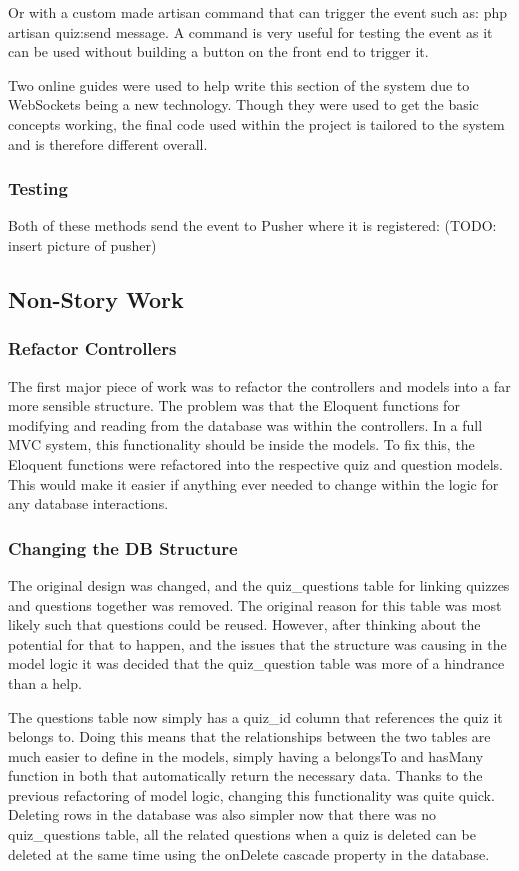 Or with a custom made artisan command that can trigger the event such as: php artisan quiz:send {message}. A command is very useful for testing the event as it can be used without building a button on the front end to trigger it.

Two online guides were used to help write this section of the system due to WebSockets being a new technology\cite{pusher-guide}\cite{echo-guide}. Though they were used to get the basic concepts working, the final code used within the project is tailored to the system and is therefore different overall.
 
\subsubsection{Testing}
Both of these methods send the event to Pusher where it is registered: (TODO: insert picture of pusher)
\newpage

\subsection{Non-Story Work}
\subsubsection{Refactor Controllers}
The first major piece of work was to refactor the controllers and models into a far more sensible structure. The problem was that the Eloquent functions for modifying and reading from the database was within the controllers. In a full MVC system, this functionality should be inside the models. To fix this, the Eloquent functions were refactored into the respective quiz and question models. This would make it easier if anything ever needed to change within the logic for any database interactions.
\subsubsection{Changing the DB Structure}
The original design was changed, and the quiz\_questions table for linking quizzes and questions together was removed. The original reason for this table was most likely such that questions could be reused. However, after thinking about the potential for that to happen, and the issues that the structure was causing in the model logic it was decided that the quiz\_question table was more of a hindrance than a help.

The questions table now simply has a quiz\_id column that references the quiz it belongs to. Doing this means that the relationships between the two tables are much easier to define in the models, simply having a belongsTo and hasMany function in both that automatically return the necessary data. Thanks to the previous refactoring of model logic, changing this functionality was quite quick. Deleting rows in the database was also simpler now that there was no quiz\_questions table, all the related questions when a quiz is deleted can be deleted at the same time using the onDelete cascade property in the database.
